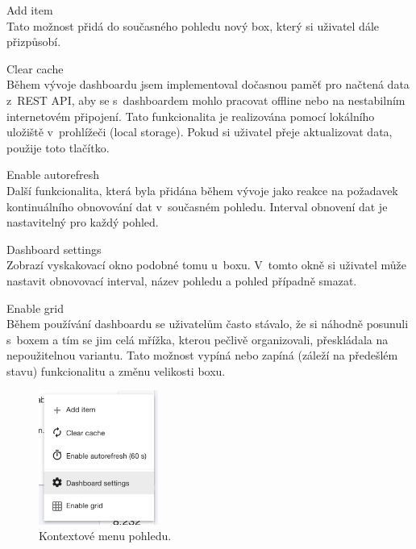 \begin{description}
    \item Add item \\
        Tato možnost přidá do současného pohledu nový box, který si uživatel dále přizpůsobí.

    \item Clear cache \\
        Během vývoje dashboardu jsem implementoval dočasnou paměť pro načtená data z~REST API, aby se s~dashboardem mohlo pracovat offline nebo na nestabilním internetovém připojení. Tato funkcionalita je realizována pomocí lokálního uložiště v~prohlížeči (local storage). Pokud si uživatel přeje aktualizovat data, použije toto tlačítko. 

    \item Enable autorefresh \\
        Další funkcionalita, která byla přidána během vývoje jako reakce na požadavek kontinuálního obnovování dat v~současném pohledu. Interval obnovení dat je nastavitelný pro každý pohled.

    \item Dashboard settings \\
        Zobrazí vyskakovací okno podobné tomu u~boxu. V~tomto okně si uživatel může nastavit obnovovací interval, název pohledu a pohled případně smazat.
        
    \item Enable grid\\
        Během používání dashboardu se uživatelům často stávalo, že si náhodně posunuli s~boxem a tím se jim celá mřížka, kterou pečlivě organizovali, přeskládala na nepoužitelnou variantu. Tato možnost vypíná nebo zapíná (záleží na předešlém stavu)  funkcionalitu a změnu velikosti boxu.
\end{description}

\begin{figure}[ht]
    \centering
    \includegraphics[width=0.35\textwidth]{fig/dashboard_menu.png}
    \caption{Kontextové menu pohledu.} \label{fig:dashboard_menu}
\end{figure}

